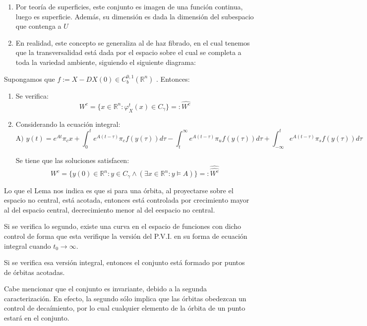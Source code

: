 \begin{rmrk}
	\begin{enumerate}
		\item Por teoría de superficies, este conjunto es imagen de una función continua, luego es superficie. Además, su dimensión es dada la dimensión del subespacio que contenga a $U$
		
		\item En realidad, este concepto se generaliza al de haz fibrado, en el cual tenemos que la transversalidad está dada por el espacio sobre el cual se completa a toda la variedad ambiente, siguiendo el siguiente diagrama: 
	\end{enumerate}
\end{rmrk}

\begin{lem}
	Supongamos que $f:= X-DX(0)\in C_b^{0,1}(\mathbb{R}^n)$ . Entonces:
	
	\begin{enumerate}
		\item Se verifica: \begin{equation*}
			W^c = \{x\in \mathbb{R}^n : \varphi^t_X(x)  \in C_\gamma\}=: \widehat{W^c}
		\end{equation*}
		
		\item Considerando la ecuación integral: \begin{equation*}
			\text{A) } y(t) = e^{At}\pi_c x + \int_0^t e^{A(t-\tau)}\pi_c f(y(\tau)) d\tau - \int_{t}^{\infty} e^{A(t-\tau)}\pi_u f(y(\tau)) d\tau + \int_{-\infty}^t e^{A(t-\tau)}\pi_s f(y(\tau)) d\tau
		\end{equation*}
		
		Se tiene que las soluciones satisfacen: \begin{equation*}
			W^c = \{y(0) \in \mathbb{R}^n : y \in C_\gamma \land (\exists x \in \mathbb{R}^n : y \vDash A)\}=: \widehat{\widehat{W^c}}
		\end{equation*}
	\end{enumerate}
\end{lem}

\begin{rmrk}
	Lo que el Lema nos indica es que si para una órbita, al proyectarse sobre el espacio no central, está acotada, entonces está controlada por crecimiento mayor al del espacio central, decrecimiento menor al del eespacio no central. 
	
	Si se verifica lo segundo, existe una curva en el espacio de funciones con dicho control de forma que esta verifique la versión del P.V.I.  en su forma de ecuación integral cuando $t_0 \to \infty$. 
	
	Si se verifica esa versión integral, entonces el conjunto está formado por puntos de órbitas acotadas.
	
	Cabe mencionar que el conjunto es invariante, debido a la segunda caracterización. En efecto, la segundo sólo implica que las órbitas obedezcan un control de decaímiento, por lo cual cualquier elemento de la órbita de un punto estará en el conjunto. 
\end{rmrk}

